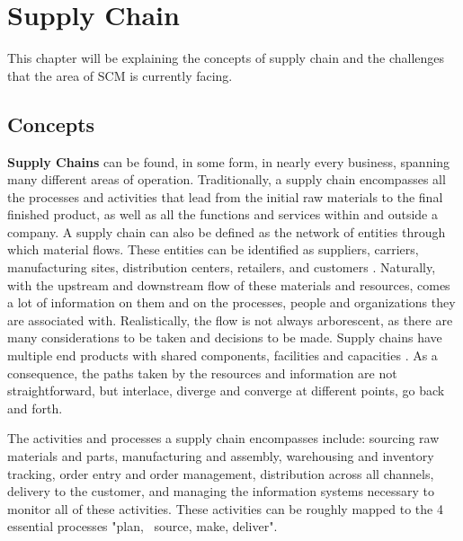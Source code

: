 \chapter{Supply Chain}
\label{chap:supply-chain-problems}


This chapter will be explaining the concepts of supply chain and the challenges that the area of SCM is currently facing.

\section{Concepts}
\textbf{Supply Chains} can be found, in some form, in nearly every business, spanning many different areas of operation. Traditionally, a supply chain encompasses all the processes and activities that lead from the initial raw materials to the final finished product, as well as all the functions and services within and outside a company. A supply chain can also be defined as the network of entities through which material flows. These entities can be identified as suppliers, carriers, manufacturing sites, distribution centers, retailers, and customers \cite{Lummus2014}. Naturally, with the upstream and downstream flow of these materials and resources, comes a lot of information on them and on the processes, people and organizations they are associated with. Realistically, the  flow is not always arborescent, as there are many considerations to be taken and decisions to be made. Supply chains have multiple end products with shared components, facilities and capacities \cite{Ganeshan1995}. As a consequence, the paths taken by the resources and information are not straightforward, but interlace, diverge and converge at different points, go back and forth.
  
  
  The activities and processes a supply chain encompasses include: sourcing raw materials and parts, manufacturing and assembly, warehousing and inventory tracking, order entry and order management, distribution across all channels, delivery to the customer, and managing the information systems necessary to monitor all of these activities. These activities can be roughly mapped to the 4 essential processes "plan,~ source, make, deliver". \cite{Lummus2014}
  
  
